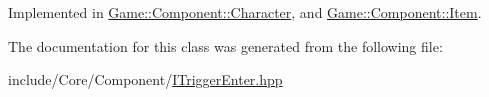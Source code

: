 Implemented in \mbox{\hyperlink{class_game_1_1_component_1_1_character_a69ff22151cf9599aab5cbe6929505c8e}{Game\+::\+Component\+::\+Character}}, and \mbox{\hyperlink{class_game_1_1_component_1_1_item_ae5369b261c5d6212de4b3f21ce02c672}{Game\+::\+Component\+::\+Item}}.



The documentation for this class was generated from the following file\+:\begin{DoxyCompactItemize}
\item 
include/\+Core/\+Component/\mbox{\hyperlink{_i_trigger_enter_8hpp}{I\+Trigger\+Enter.\+hpp}}\end{DoxyCompactItemize}
